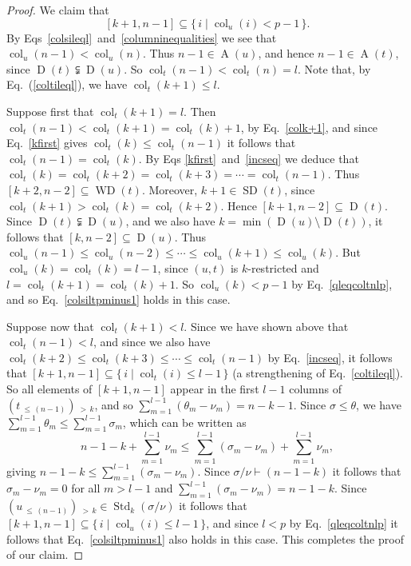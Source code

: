 \documentclass[10pt]{amsart}
\theoremstyle{definition}
\DeclareMathOperator{\col}{col}
\newcommand{\morethan}[2]{#1\,{_{>\,#2}}}
\newcommand{\Lessthan}[2]{#1\,{_{\leqslant\,#2}}}
\DeclareMathOperator{\STD}{Std}
\DeclareMathOperator{\SD}{SD}
\DeclareMathOperator{\WD}{WD}
\DeclareMathOperator{\D}{D}
\DeclareMathOperator{\A}{A}
\begin{document}
\begin{proof}
We claim that
\begin{equation}\label{colsiltpminus1}
[k+1,n-1] \subseteq \{\,i\mid\col_u(i)<p-1\,\}.
\end{equation}
By Eqs~\eqref{colsileql}~and~\eqref{columninequalities} we see that
$\col_u(n-1)<\col_u(n)$. Thus $n-1\in\A(u)$, and hence $n-1\in\A(t)$, since
$\D(t)\subsetneqq\D(u)$. So $\col_t(n-1)<\col_t(n)=l$.
Note that, by Eq.~(\ref{coltileql}), we have $\col_t(k+1)\leq l$.

Suppose first that $\col_t(k+1)=l$. Then $\col_t(n-1)<\col_t(k+1)=\col_t(k)+1$,
by Eq.~\eqref{colk+1}, and since Eq.~\eqref{kfirst} gives $\col_t(k)\leqslant\col_t(n-1)$
it follows that $\col_t(n-1)=\col_t(k)$. By Eqs \eqref{kfirst}~and~\eqref{incseq}
we deduce that $\col_t(k)=\col_t(k+2)=\col_t(k+3)=\cdots=\col_t(n-1)$.
Thus $[k+2,n-2]\subseteq\WD(t)$. Moreover, $k+1\in\SD(t)$, since
$\col_t(k+1)>\col_t(k)=\col_t(k+2)$. Hence $[k+1,n-2]\subseteq\D(t)$. Since
$\D(t)\subsetneqq\D(u)$, and we
also have $k=\min(\D(u)\setminus\D(t))$, it follows that $[k,n-2]\subseteq\D(u)$.
Thus $\col_u(n-1)\leqslant\col_u(n-2)\leqslant\cdots\leqslant\col_u(k+1)\leqslant\col_u(k)$.
But $\col_u(k)=\col_t(k)=l-1$, since $(u,t)$ is $k$-restricted and
$l=\col_t(k+1)=\col_t(k)+1$.
So $\col_u(k)<p-1$ by Eq.~\eqref{qleqcoltnlp}, and so Eq.~\eqref{colsiltpminus1}
holds in this case.

Suppose now that $\col_t(k+1)<l$. Since we have shown above that $\col_t(n-1)<l$,
and since we also have $\col_t(k+2)\leqslant\col_t(k+3)\leqslant\cdots\leqslant\col_t(n-1)$ by
Eq.~\eqref{incseq}, it follows that $[k+1,n-1]\subseteq\{\,i\mid\col_t(i)\leqslant l-1\,\}$
(a strengthening of Eq.~\eqref{coltileql}). So all elements of $[k+1,n-1]$ appear in
the first $l-1$ columns of $\morethan{(\Lessthan t{(n-1)})}k$, and so
$\sum_{m=1}^{l-1}(\theta_m-\nu_m)=n-k-1$. Since $\sigma\leqslant\theta$, we have
$\sum_{m=1}^{l-1}\theta_m\leqslant\sum_{m=1}^{l-1}\sigma_m$, which can be written as
\begin{equation*}
n-1-k + \sum_{m=1}^{l-1}\nu_m \leqslant\sum_{m=1}^{l-1} (\sigma_m-\nu_m) + \sum_{m=1}^{l-1}\nu_m,
\end{equation*}
giving $n-1-k\leqslant\sum_{m=1}^{l-1} (\sigma_m-\nu_m)$. Since
$\sigma/\nu\vdash(n-1-k)$ it follows that $\sigma_m-\nu_m=0$ for
all $m>l-1$ and $\sum_{m=1}^{l-1} (\sigma_m-\nu_m)= n-1-k$. Since
$\morethan{(\Lessthan u{(n-1)})}k\in\STD_k(\sigma/\nu)$ it follows that
$[k+1,n-1]\subseteq\{\,i\mid\col_u(i)\leqslant l-1\,\}$,
and since $l<p$ by Eq.~\eqref{qleqcoltnlp} it follows that
Eq.~\eqref{colsiltpminus1} also holds in this case. This completes the proof of our claim.


\end{proof}
\end{document}
